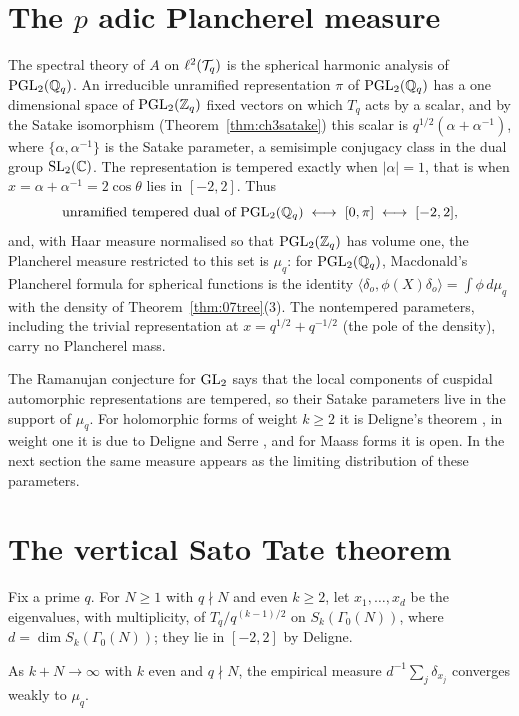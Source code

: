 \section{The $p$ adic Plancherel measure}

The spectral theory of $A$ on $\ell^2(\mathcal{T}_q)$ is the spherical harmonic analysis of $\mathrm{PGL}_2(\mathbb{Q}_q)$. An irreducible unramified representation $\pi$ of $\mathrm{PGL}_2(\mathbb{Q}_q)$ has a one dimensional space of $\mathrm{PGL}_2(\mathbb{Z}_q)$ fixed vectors on which $T_q$ acts by a scalar, and by the Satake isomorphism (Theorem~\ref{thm:ch3satake}) this scalar is $q^{1/2}(\alpha+\alpha^{-1})$, where $\{\alpha,\alpha^{-1}\}$ is the Satake parameter, a semisimple conjugacy class in the dual group $\mathrm{SL}_2(\mathbb{C})$. The representation is tempered exactly when $|\alpha|=1$, that is when $x=\alpha+\alpha^{-1}=2\cos\theta$ lies in $[-2,2]$. Thus
\[
\text{unramified tempered dual of }\mathrm{PGL}_2(\mathbb{Q}_q)\;\longleftrightarrow\;[0,\pi]\;\longleftrightarrow\;[-2,2],
\]
and, with Haar measure normalised so that $\mathrm{PGL}_2(\mathbb{Z}_q)$ has volume one, the Plancherel measure restricted to this set is $\mu_q$: for $\mathrm{PGL}_2(\mathbb{Q}_q)$, Macdonald's Plancherel formula for spherical functions \cite{macdonald1971} is the identity $\langle\delta_o,\phi(X)\delta_o\rangle=\int\phi\,d\mu_q$ with the density of Theorem~\ref{thm:07tree}(3). The nontempered parameters, including the trivial representation at $x=q^{1/2}+q^{-1/2}$ (the pole of the density), carry no Plancherel mass.

The Ramanujan conjecture for $\mathrm{GL}_2$ says that the local components of cuspidal automorphic representations are tempered, so their Satake parameters live in the support of $\mu_q$. For holomorphic forms of weight $k\ge2$ it is Deligne's theorem \cite{deligne1974}, in weight one it is due to Deligne and Serre \cite{deligneserre1974}, and for Maass forms it is open. In the next section the same measure appears as the limiting distribution of these parameters.

\section{The vertical Sato Tate theorem}

Fix a prime $q$. For $N\ge1$ with $q\nmid N$ and even $k\ge2$, let $x_1,\dots,x_d$ be the eigenvalues, with multiplicity, of $T_q/q^{(k-1)/2}$ on $S_k(\Gamma_0(N))$, where $d=\dim S_k(\Gamma_0(N))$; they lie in $[-2,2]$ by Deligne.

\begin{theorem}\label{thm:07serre}
As $k+N\to\infty$ with $k$ even and $q\nmid N$, the empirical measure $d^{-1}\sum_j\delta_{x_j}$ converges weakly to $\mu_q$.
\end{theorem}

